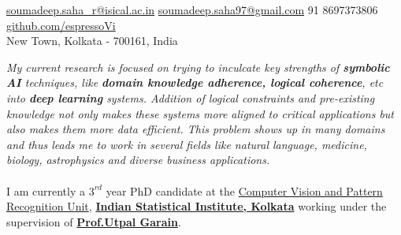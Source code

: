 \documentclass[10pt,a4paper]{article}
\begin{document}
\sloppy


\nobreakvspace{0.3em}

\noindent\href{mailto:soumadeep.saha\_r@isical.ac.in}{soumadeep.saha\_r@isical.ac.in}\sbull
\noindent\href{mailto:soumadeep.saha97@gmail.com}{soumadeep.saha97@gmail.com}\sbull
\textsmaller{+}91 8697373806\sbull
\href{https://github.com/espressoVi}{github.com/espressoVi}\\
New Town, Kolkata - 700161, India

\spacedhrule{0.9em}{-0.4em}


\vspace{-1.3em}  %
\begin{multicols}{2}  %
\noindent \emph{My current research is focused on trying to inculcate key strengths of \textbf{symbolic AI} techniques, like \textbf{domain knowledge adherence, logical coherence}, etc into \textbf{deep learning} systems.
	Addition of logical constraints and pre-existing knowledge not only makes these systems more aligned to critical applications but also makes them more data efficient.
	This problem shows up in many domains and thus leads me to work in several fields like natural language, medicine, biology, astrophysics and diverse business applications.}
\\
\\
	I am currently a $3^{rd}$ year PhD candidate at the \href{https://cvpru.isical.ac.in/}{Computer Vision and Pattern Recognition Unit}, \href{https://www.isical.ac.in/}{\textbf{Indian Statistical Institute, Kolkata}} working under the supervision of \textbf{\href{https://www.isical.ac.in/~utpal}{Prof.\;Utpal Garain}}.
\end{multicols}
\end{document}
